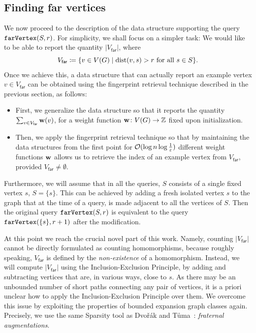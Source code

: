 \newcommand{\fr}{\mathsf{far}}

\subsection{Finding far vertices}

We now proceed to the description of the data structure supporting the query $\mathtt{farVertex}(S,r)$. For simplicity, we shall focus on a simpler task: We would like to be able to report the quantity $|V_\fr|$, where
\[V_\fr\coloneqq \{v\in V(G)\mid \dist(v,s)>r\textrm{ for all }s\in S\}.\]
Once we achieve this, a data structure that can actually report an example vertex $v\in V_\fr$ can be obtained using the fingerprint retrieval technique described in the previous section, as follows:
\begin{itemize}
	\item First, we generalize the data structure so that it reports the quantity $\sum_{v\in V_\fr} \wei(v)$, for a weight function $\mathbf{w}\colon V(G)\to \mathbb{Z}$ fixed upon initialization.
	\item Then, we apply the fingerprint retrieval technique so that by maintaining the data structures from the first point for $\mathcal{O}(\log n\log \tfrac{1}{\varepsilon})$ different weight functions $\mathbf{w}$ allows us to retrieve the index of an example vertex from $V_\fr$, provided $V_\fr\neq \emptyset$.
\end{itemize}

Furthermore, we will assume that in all the queries, $S$ consists of a single fixed vertex $s$, $S=\{s\}$. This can be achieved by adding a fresh isolated vertex $s$ to the graph that at the time of a query, is made adjacent to all the vertices of $S$. Then the original query $\mathtt{farVertex}(S,r)$ is equivalent to the query $\mathtt{farVertex}(\{s\},r+1)$ after the modification.

At this point we reach the crucial novel part of this work. Namely, counting $|V_\fr|$ cannot be directly formulated as counting homomorphisms, because roughly speaking, $V_\fr$ is defined by the \emph{non-existence} of a homomorphism. Instead, we will compute $|V_\fr|$ using the Inclusion-Exclusion Principle, by adding and subtracting vertices that are, in various ways, close to $s$. As there may be an unbounded number of short paths connecting any pair of vertices, it is a priori unclear how to apply the Inclusion-Exclusion Principle over them. We overcome this issue by exploiting the  properties of bounded expansion graph classes again.
Precisely, we use the same Sparsity tool as Dvo\v{r}\'ak and T\r{u}ma~\cite{DvorakT13}: \emph{fraternal augmentations}.

